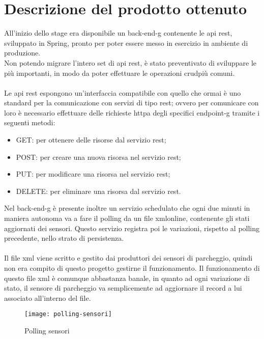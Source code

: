 \section{Descrizione del prodotto ottenuto}

All'inizio dello stage era disponibile un \gls{back-end-g} contenente le \gls{api} \gls{rest}, sviluppato in Spring, pronto per
poter essere messo in esercizio in ambiente di produzione.
\\
Non potendo migrare l'intero set di \gls{api} \gls{rest}, è stato preventivato di sviluppare
le più importanti, in modo da poter effettuare le operazioni \gls{crud}\glsfirstoccur più
comuni.
\\\\
Le \gls{api} \gls{rest} espongono un'interfaccia compatibile con quello che ormai è uno standard per la
comunicazione con servizi di tipo \gls{rest}; ovvero per comunicare con loro è necessario effettuare
delle richieste \gls{http}\glsfirstoccur a degli specifici \gls{endpoint-g} tramite i seguenti metodi:
\begin{itemize}
    \item GET: per ottenere delle risorse dal servizio \gls{rest};
    \item POST: per creare una nuova risorsa nel servizio \gls{rest};
    \item PUT: per modificare una risorsa nel servizio \gls{rest};
    \item DELETE: per eliminare una risorsa dal servizio \gls{rest}.
\end{itemize}
\leavevmode\newline
Nel \gls{back-end-g} è presente inoltre un servizio schedulato che ogni due minuti in maniera autonoma va a fare il polling
da un file \gls{xml}\glsfirstoccur online, contenente gli stati aggiornati dei sensori. Questo servizio registra poi 
le variazioni, rispetto
al polling precedente, nello strato di persistenza.
\\\\
Il file \gls{xml} viene scritto e gestito dai produttori dei sensori di parcheggio, quindi non era compito di questo 
progetto gestirne il funzionamento. Il funzionamento di questo file \gls{xml} è comunque abbastanza banale,
in quanto ad ogni variazione di stato, il sensore di parcheggio va semplicemente ad aggiornare 
il record a lui associato
all'interno del file.
\\
\begin{figure}[H]
    \centering
    \texttt{[image: polling-sensori]}
    \caption{Polling sensori}
\end{figure}
\leavevmode\newline

